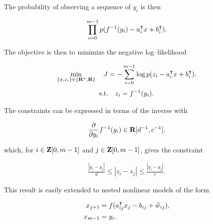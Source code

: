\documentclass{article}
\begin{document}
    The probability of observing a sequence of $y_i$ is then

    \begin{align*}
        \prod_{i=0}^{m-1} p(f^{-1}(y_i) - a_i^\intercal x + b_i^\intercal).
    \end{align*}

    The objective is then to minimize the negative log--likelihood

    \begin{align*}
        \min_{\{x,z_i\}\in\{\textbf{R}^n,\textbf{R}\}}\quad J = -\sum_{i=0}^{m-1} \log p(z_i - a_i^\intercal x + b_i^\intercal).
    \end{align*}
    \begin{align*}
        \text{s.t.}\quad z_i=f^{-1}(y_i).
    \end{align*}

    The constraints can be expressed in terms of the inverse with

    \begin{align*}
        \frac{\partial }{\partial y_i}f^{-1}(y_i)\in\textbf{R}[d^{-1},c^{-1}],
    \end{align*}

    which, for $i\in\textbf{Z}[0,m-1]$ and $j\in\textbf{Z}[0,m-1]$, gives the constraint

    \begin{align*}
        \frac{|y_i-y_j|}{d}\leq |z_i-z_j| \leq \frac{|y_i-y_j|}{c}.
    \end{align*}

    This result is easily extended to nested nonlinear models of the form

    \begin{align*}
        x_{j+1} &= f(a_{ij}^\intercal x_{j}-b_{ij} + \widetilde{w}_{ij}),\\
        x_{m-1}&=y_i.
    \end{align*}


    \clearpage
\end{document}
